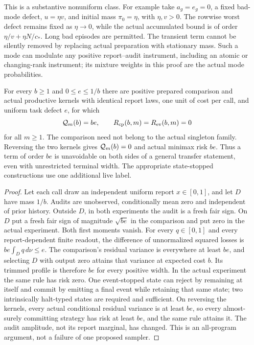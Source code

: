 This is a substantive nonuniform class. For example take $a_g=e_g=0$, a fixed bad-mode defect, $u=\eta v$, and initial mass $\pi_0=\eta$, with $\eta,v>0$. The rowwise worst defect remains fixed as $\eta\to0$, while the actual accumulated bound is of order $\eta/v+\eta N/c_*$. Long bad episodes are permitted. The transient term cannot be silently removed by replacing actual preparation with stationary mass. Such a mode can modulate any positive report--audit instrument, including an atomic or changing-rank instrument; its mixture weights in this proof are the actual mode probabilities.

\begin{proposition}\label{prop:reference-sharpness}
For every $b\ge1$ and $0\le e\le1/b$ there are positive prepared comparison and actual productive kernels with identical report laws, one unit of cost per call, and uniform task defect $e$, for which
\[
 \mathcal Q_m(b)=be,\qquad R_{\mathrm{cp}}(b,m)=R_{\mathrm{ev}}(b,m)=0
\]
for all $m\ge1$. The comparison need not belong to the actual singleton family. Reversing the two kernels gives $\mathcal Q_m(b)=0$ and actual minimax risk $be$. Thus a term of order $be$ is unavoidable on both sides of a general transfer statement, even with unrestricted terminal width. The appropriate state-stopped constructions use one additional live label.
\end{proposition}
\begin{proof}
Let each call draw an independent uniform report $x\in[0,1]$, and let $D$ have mass $1/b$. Audits are unobserved, conditionally mean zero and independent of prior history. Outside $D$, in both experiments the audit is a fresh fair sign. On $D$ put a fresh fair sign of magnitude $\sqrt{be}$ in the comparison and put zero in the actual experiment. Both first moments vanish. For every $q\in[0,1]$ and every report-dependent finite readout, the difference of unnormalized squared losses is
$be\int_D q\,d\nu\le e$.
The comparison's residual variance is everywhere at least $be$, and selecting $D$ with output zero attains that variance at expected cost $b$. Its trimmed profile is therefore $be$ for every positive width. In the actual experiment the same rule has risk zero. One event-stopped state can reject by remaining at itself and commit by emitting a final event while retaining that same state; two intrinsically halt-typed states are required and sufficient. On reversing the kernels, every actual conditional residual variance is at least $be$, so every almost-surely committing strategy has risk at least $be$, and the same rule attains it. The audit amplitude, not its report marginal, has changed. This is an all-program argument, not a failure of one proposed sampler.
\end{proof}
